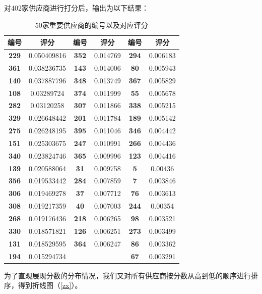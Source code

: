 \documentclass{my_paper}
\begin{document}
对402家供应商进行打分后，输出为以下结果：
\begin{table}[hbt]
\centering
\caption{50家重要供应商的编号以及对应评分}
\begin{tabular}{cc|cc|cc}
\toprule
编号  & 评分          & 编号  & 评分       & 编号  & 评分       \\\midrule
\textbf{229} & 0.050409816 & \textbf{352} & 0.014769 & \textbf{294} & 0.006183 \\
\textbf{361} & 0.038236735 & \textbf{143} & 0.014006 & \textbf{80 } & 0.005943 \\
\textbf{140} & 0.037887796 & \textbf{348} & 0.013749 & \textbf{367} & 0.005829 \\
\textbf{108} & 0.03289724  & \textbf{374} & 0.011999 & \textbf{55 } & 0.005678 \\
\textbf{282} & 0.03120258  & \textbf{307} & 0.011866 & \textbf{338} & 0.005215 \\
\textbf{329} & 0.026648442 & \textbf{201} & 0.011784 & \textbf{189} & 0.005142 \\
\textbf{275} & 0.026248195 & \textbf{395} & 0.011046 & \textbf{346} & 0.004442 \\
\textbf{151} & 0.025303675 & \textbf{247} & 0.010991 & \textbf{266} & 0.004436 \\
\textbf{340} & 0.023824746 & \textbf{365} & 0.009996 & \textbf{123} & 0.004416 \\
\textbf{139} & 0.020588064 & \textbf{31 } & 0.009758 & \textbf{5  } & 0.00436  \\
\textbf{356} & 0.019533442 & \textbf{284} & 0.007859 & \textbf{7  } & 0.003846 \\
\textbf{306} & 0.019469278 & \textbf{37 } & 0.007712 & \textbf{76 } & 0.003613 \\
\textbf{308} & 0.019217359 & \textbf{40 } & 0.007003 & \textbf{244} & 0.00354  \\
\textbf{268} & 0.019176436 & \textbf{218} & 0.006265 & \textbf{98 } & 0.003521 \\
\textbf{330} & 0.018571821 & \textbf{126} & 0.006251 & \textbf{273} & 0.003499 \\
\textbf{131} & 0.018529595 & \textbf{364} & 0.006247 & \textbf{86 } & 0.003362 \\
\textbf{194} & 0.015294734 &  &          & \textbf{67 } & 0.003291\\
\bottomrule
  \end{tabular}
\label{res1}
  \end{table}

为了直观展现分数的分布情况，我们又对所有供应商按分数从高到低的顺序进行排序，得到折线图（\ref{zx}）。
\end{document}
